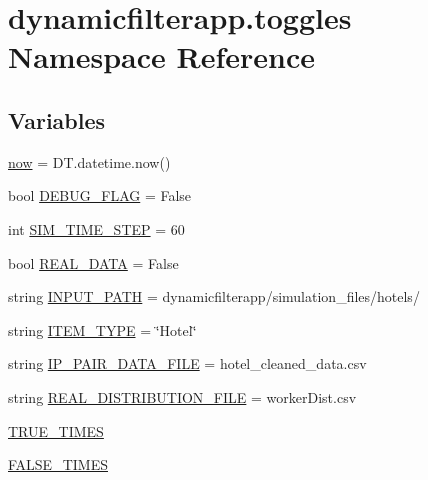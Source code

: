 \hypertarget{namespacedynamicfilterapp_1_1toggles}{}\section{dynamicfilterapp.\+toggles Namespace Reference}
\label{namespacedynamicfilterapp_1_1toggles}
\subsection*{Variables}
\begin{DoxyCompactItemize}
\item 
\mbox{\hyperlink{namespacedynamicfilterapp_1_1toggles_afdc24ca189ea1f66dfd9245b4c970d59}{now}} = D\+T.\+datetime.\+now()
\item 
bool \mbox{\hyperlink{namespacedynamicfilterapp_1_1toggles_a5c62a4f8ba41755a0f5e48c54c4705b8}{D\+E\+B\+U\+G\+\_\+\+F\+L\+AG}} = False
\item 
int \mbox{\hyperlink{namespacedynamicfilterapp_1_1toggles_abcfb6d906296c8771261764bd2895303}{S\+I\+M\+\_\+\+T\+I\+M\+E\+\_\+\+S\+T\+EP}} = 60
\item 
bool \mbox{\hyperlink{namespacedynamicfilterapp_1_1toggles_a00674fe8ef8f59b37d7fe239813bb627}{R\+E\+A\+L\+\_\+\+D\+A\+TA}} = False
\item 
string \mbox{\hyperlink{namespacedynamicfilterapp_1_1toggles_aca6b14e235be3a92f729918cfcfed5e5}{I\+N\+P\+U\+T\+\_\+\+P\+A\+TH}} = \textquotesingle{}dynamicfilterapp/simulation\+\_\+files/hotels/\textquotesingle{}
\item 
string \mbox{\hyperlink{namespacedynamicfilterapp_1_1toggles_ab7ef0f87c772b28128250ee46f5390ab}{I\+T\+E\+M\+\_\+\+T\+Y\+PE}} = \char`\"{}Hotel\char`\"{}
\item 
string \mbox{\hyperlink{namespacedynamicfilterapp_1_1toggles_a43d654f8629542974ec1db04c0fc580a}{I\+P\+\_\+\+P\+A\+I\+R\+\_\+\+D\+A\+T\+A\+\_\+\+F\+I\+LE}} = \textquotesingle{}hotel\+\_\+cleaned\+\_\+data.\+csv\textquotesingle{}
\item 
string \mbox{\hyperlink{namespacedynamicfilterapp_1_1toggles_ad581376e3eb6ca15bbbe096863891cec}{R\+E\+A\+L\+\_\+\+D\+I\+S\+T\+R\+I\+B\+U\+T\+I\+O\+N\+\_\+\+F\+I\+LE}} = \textquotesingle{}worker\+Dist.\+csv\textquotesingle{}
\item 
\mbox{\hyperlink{namespacedynamicfilterapp_1_1toggles_a6794acc9ab30adea862f4077cf9adae7}{T\+R\+U\+E\+\_\+\+T\+I\+M\+ES}}
\item 
\mbox{\hyperlink{namespacedynamicfilterapp_1_1toggles_a809d01bf46cd20093532e7cbc0960874}{F\+A\+L\+S\+E\+\_\+\+T\+I\+M\+ES}}

\end{DoxyCompactItemize}
